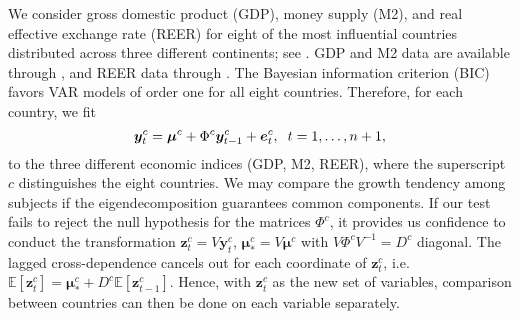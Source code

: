 \documentclass[12pt]{article}
\numberwithin{thm}{section}
\numberwithin{defn}{section}
\numberwithin{lem}{section}
\numberwithin{prop}{section}
\numberwithin{cor}{section}
\numberwithin{rem}{section}
\begin{document}
We consider gross domestic product (GDP), money supply (M2), and real effective exchange rate (REER) for eight of the most influential countries distributed across three different continents; see . GDP and M2 data are available through \cite{ceic}, and REER data through \cite{oecd}. The Bayesian information criterion (BIC) favors VAR models of order one for all eight countries. Therefore, for each country, we fit 
$$
\bm{y}_{t}^c = \bm{\mu}^c + \Phi^c \bm{y}_{t - 1}^c + \bm{e}_{t}^c,
\hspace{0.2cm} t = 1, \dots, n+1,
$$
to the three different economic indices (GDP, M2, REER),
where the superscript $c$ distinguishes the eight countries.
We may compare the growth tendency among subjects if the eigendecomposition guarantees common components. 
If our test fails to reject the null hypothesis for the matrices $\Phi^c$, it provides us confidence to conduct the transformation $\bm{z}_{t}^c = V \bm{y}_{t}^c$, $\bm{\mu}_*^c = V \bm{\mu}^c$ with $V \Phi^c V^{-1} = D^c$ diagonal. The lagged cross-dependence cancels out for each coordinate of $\bm{z}_{t}^c$, i.e.
$\mathbb{E}[\bm{z}_t^c] = \bm{\mu}_*^c + D^c \mathbb{E}[\bm{z}_{t-1}^c]$.
Hence, with $\bm{z}^{c}_t$ as the new set of variables, comparison between countries can then be done on each variable separately.
\end{document}
